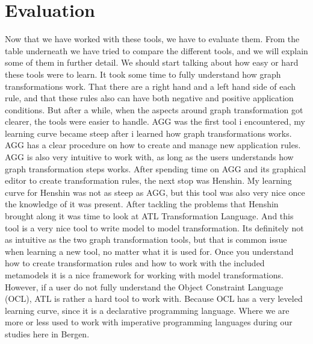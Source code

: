 \documentclass[pdftex,11pt,a4paper]{article}
\begin{document}
\section{Evaluation}
\noindent Now that we have worked with these tools, we have to evaluate them.
From the table underneath we have tried to compare the different tools, and we
will explain some of them in further detail. We should start talking about how
easy or hard these tools were to learn. It took some time to fully understand
how graph transformations work. That there are a right hand and a left hand
side of each rule, and that these rules also can have both negative and
positive application conditions. But after a while, when the aspects around
graph transformation got clearer, the tools were easier to handle. AGG was the
first tool i encountered, my learning curve became steep after i learned how
graph transformations works. AGG has a clear procedure on how to create and
manage new application rules. AGG is also very intuitive to work with, as long
as the users understands how graph transformation steps works. After spending
time on AGG and its graphical editor to create transformation rules, the next
stop was Henshin. My learning curve for Henshin was not as steep as AGG, but
this tool was also very nice once the knowledge of it was present. After
tackling the problems that Henshin brought along it was time to look at ATL
Transformation Language. And this tool is a very nice tool to write model to
model transformation. Its definitely not as intuitive as the two graph
transformation tools, but that is common issue when learning a new tool, no
matter what it is used for. Once you understand how to create transformation
rules and how to work with the included metamodels it is a nice framework for
working with model transformations. However, if a user do not fully understand
the Object Constraint Language (OCL), ATL is rather a hard tool to work with.
Because OCL has a very leveled learning curve, since it is a declarative
programming language. Where we are more or less used to work with imperative
programming languages during our studies here in Bergen.
\end{document}
